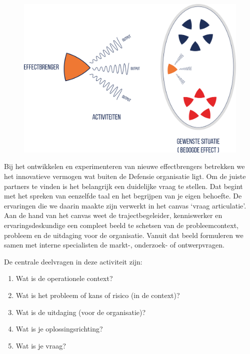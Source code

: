 \documentclass[
]{book}
\providecommand{\tightlist}{%
  \setlength{\itemsep}{0pt}\setlength{\parskip}{0pt}}
\begin{document}
\begin{figure}

{\centering \includegraphics[width=450pt]{data/images/20210324-MDI-effectbrenger-ei} 

}

\caption{ }\label{fig:unnamed-chunk-9}
\end{figure}

Bij het ontwikkelen en experimenteren van nieuwe effectbrengers betrekken we het innovatieve vermogen wat buiten de Defensie organisatie ligt. Om de juiste partners te vinden is het belangrijk een duidelijke vraag te stellen. Dat begint met het spreken van eenzelfde taal en het begrijpen van je eigen behoefte. De ervaringen die we daarin maakte zijn verwerkt in het canvas `vraag articulatie'. Aan de hand van het canvas weet de trajectbegeleider, kenniswerker en ervaringsdeskundige een compleet beeld te schetsen van de probleemcontext, probleem en de uitdaging voor de organisatie. Vanuit dat beeld formuleren we samen met interne specialisten de markt-, onderzoek- of ontwerpvragen.

De centrale deelvragen in deze activiteit zijn:

\begin{enumerate}
\def\labelenumi{\arabic{enumi}.}
\tightlist
\item
  Wat is de operationele context?
\item
  Wat is het probleem of kans of risico (in de context)?
\item
  Wat is de uitdaging (voor de organisatie)?
\item
  Wat is je oplossingsrichting?
\item
  Wat is je vraag?
\end{enumerate}
\end{document}
